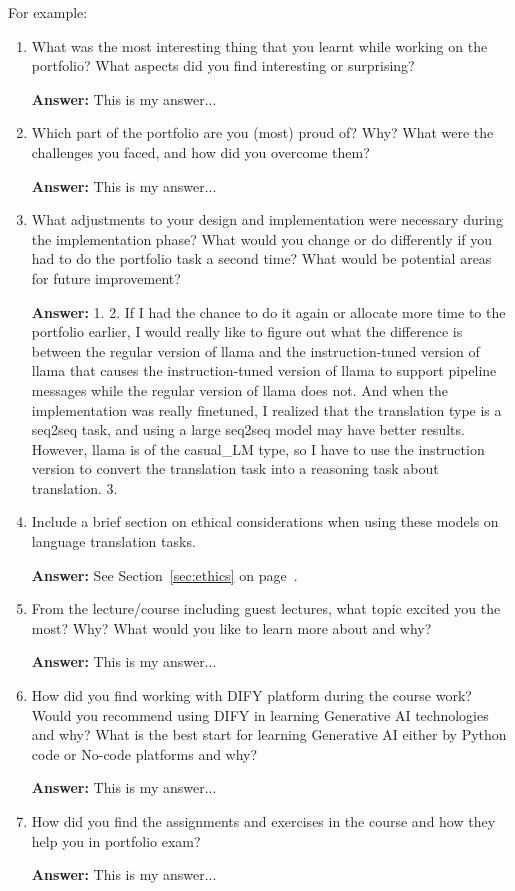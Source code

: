 For example:
\begin{enumerate}
    \item   What was the most interesting thing that you learnt while working on the portfolio?
            What aspects did you find interesting or surprising? 
    
    \textbf{Answer:}
    This is my answer...
    
    \item   Which part of the portfolio are you (most) proud of?
            Why?
            What were the challenges you faced, and how did you overcome them? 

    \textbf{Answer:}
    This is my answer...

    \item   What adjustments to your design and implementation were necessary during the implementation phase?
            What would you change or do differently if you had to do the portfolio task a second time?
            What would be potential areas for future improvement?
    
    \textbf{Answer:}
    1.
    2. If I had the chance to do it again or allocate more time to the portfolio earlier, 
    I would really like to figure out what the difference is between the regular version of llama and 
    the instruction-tuned version of llama that causes the instruction-tuned version of llama 
    to support pipeline messages while the regular version of llama does not.
    And when the implementation was really fine\-tuned, I realized that the translation type is a seq2seq task, 
    and using a large seq2seq model may have better results. However, llama is of the casual_LM type, so I have to use the instruction version to convert the translation task into a reasoning task about translation.
    3.

    \item   Include a brief section on ethical considerations when using these models on language translation tasks.
    
    \textbf{Answer:}
    See Section~\ref{sec:ethics} on page~\pageref{sec:ethics}.

    \item   From the lecture/course including guest lectures, what topic excited you the most?
            Why?
            What would you like to learn more about and why?
    
    \textbf{Answer:}
    This is my answer...

    \item   How did you find working with DIFY platform during the course work?
            Would you recommend using DIFY in learning Generative AI technologies and why?
            What is the best start for learning Generative AI either by Python code or No-code platforms and why?
    
    \textbf{Answer:}
    This is my answer...

    \item   How did you find the assignments and exercises in the course and how they help you in portfolio exam?
    
    \textbf{Answer:}
    This is my answer...
    
\end{enumerate}

